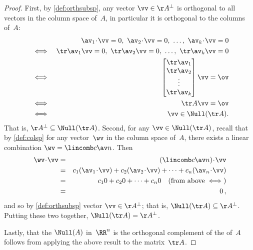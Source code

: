 \begin{proof} 
First, by \autoref{def:orthsubsp}, any vector \(\vv\in\AA^\perp\) is orthogonal to all vectors in the column space of~\(A\), in particular it is orthogonal to the columns of~\(A\):
\begin{eqnarray*}
&& \av_1\cdot\vv=0,\ \av_2\cdot\vv=0,\ \ldots,\ \av_k\cdot\vv=0
\\&\iff& \tr\av_1\vv=0,\ \tr\av_2\vv=0,\ \ldots,\ \tr\av_k\vv=0
\\&\iff&\begin{bmatrix} \tr\av_1\\\tr\av_2\\\vdots\\\tr\av_k \end{bmatrix}\vv=\ov
\\&\iff& \tr A\vv=\ov
\\&\iff&\vv\in\Null(\tr A).
\end{eqnarray*}
That is, \(\AA^\perp\subseteq\Null(\tr A)\).
Second, for any \(\vv\in\Null(\tr A)\),
recall that by \autoref{def:colsp} for any vector~\(\wv\) in the column space of~\(A\), there exists a linear combination \(\wv=\lincomb c\av n\). 
Then
\begin{eqnarray*}
\wv\cdot\vv&=&(\lincomb c\av n)\cdot\vv
\\&=&c_1(\av_1\cdot\vv)+c_2(\av_2\cdot\vv)+\cdots+c_n(\av_n\cdot\vv)
\\&=&c_10+c_20+\cdots+c_n0
\quad(\text{from above}\iff)
\\&=&0\,,
\end{eqnarray*}
and so by \autoref{def:orthsubsp} vector \(\vv\in\AA^\perp\); that is, \(\Null(\tr A)\subseteq\AA^\perp\).
Putting these two together, \(\Null(\tr A)=\AA^\perp\).

Lastly, that the \(\Null(A)\) in~\(\RR^n\) is the orthogonal complement of the  of~\(A\) follows from applying the above result to the matrix~\(\tr A\).
\end{proof}




